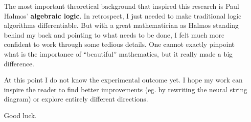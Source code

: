 The most important theoretical background that inspired this research is Paul Halmos' \textbf{algebraic logic}.  In retrospect, I just needed to make traditional logic algorithms differentiable.  But with a great mathematician as Halmos standing behind my back and pointing to what needs to be done, I felt much more confident to work through some tedious details.  One cannot exactly pinpoint what is the importance of ``beautiful'' mathematics, but it really made a big difference.

At this point I do not know the experimental outcome yet.  I hope my work can inspire the reader to find better improvements (eg. by rewriting the neural string diagram) or explore entirely different directions.

Good luck.
